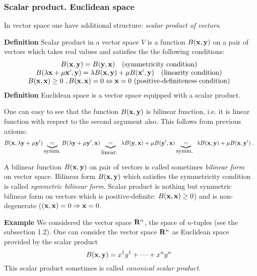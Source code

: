 \documentclass[12pt]{article}
\numberwithin{equation}{section}
\begin{document}
\subsubsection {Scalar product. Euclidean space}

In vector space one have additional structure: {\it scalar product of vectors}.

{\bf Definition} Scalar product in a vector space $V$ is  a function $B({\bf x},{\bf y})$ on a pair of
 vectors which takes real values and satisfies the  the following conditions:
               \begin{equation}\label{scalarproductproperties}
              \begin{array}  {cc}
                B({\bf x},{\bf y})=B({\bf y},{\bf x}) \quad \hbox  {(symmetricity condition)}\\
                   B(\lambda{\bf x}+\mu{\bf x}',{\bf y})=
                   \lambda B({\bf x},{\bf y})+\mu B({\bf x}',{\bf y})\quad   \hbox  {(linearity condition)}\\
                 B( {\bf x},{\bf x})\geq 0\,\, , B({\bf x},{\bf x})= 0\Leftrightarrow  {\bf x}=0\,\,
                 \hbox{(positive-definiteness condition)}
                   \end{array}
               \end{equation}
{\bf Definition } Euclidean space is a vector space equipped with a scalar product.

\m


  One can easy to see that the function $B({\bf x},{\bf y})$ is bilinear function, i.e.
  it is linear function with respect to the second 
argument also.
  This follows from previous axioms:
                   $$
   B({\bf x},\lambda{\bf y}+\mu{\bf y}')\underbrace{=}_{\hbox {symm.}}B(\lambda{\bf y}+\mu{\bf y}',{\bf x})
   \underbrace{=}_{\hbox {linear. }}\lambda B({\bf y},{\bf x})+\mu B({\bf y}',{\bf x})
   \underbrace{=}_{\hbox {symm. }}\lambda B({\bf x},{\bf y})+\mu B({\bf x},{\bf y}')\,.
                   $$

{\footnotesize A bilinear function  $B({\bf x},{\bf y})$ on pair of vectors is called sometimes {\it bilinear form} on
vector space. Bilinear form $B({\bf x},{\bf y})$  which satisfies the symmetricity condition is called
{\it symmetric bilinear form}.  Scalar product is nothing but symmetric bilinear form on vectors
which is positive-definite: $B({\bf x},{\bf x})\geq 0$) and is non-degenerate ($({\bf x},{\bf x})= 0\Rightarrow  {\bf x}=0$}.

\medskip


{\bf Example} We considered the vector space ${\bf R}^n$, the space of $n$-tuples (see the subsection 1.2).
 One can consider the vector space ${\bf R}^n$ as Euclidean space provided by the scalar product
         \begin{equation}\label{scalarproductexample1}
                    B({\bf x},{\bf y})=x^1y^1+\dots+x^ny^n
                \end{equation}
This scalar product sometimes is called {\it canonical scalar product}.
\end{document}
